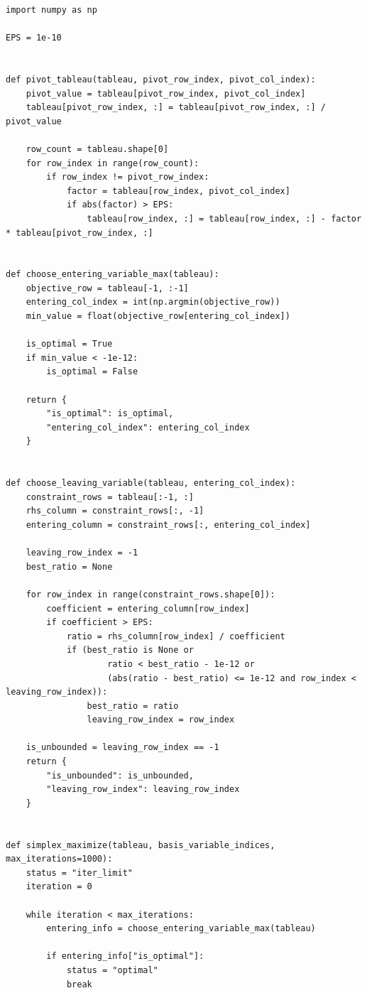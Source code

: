 \documentclass[a4paper,14pt]{extarticle}
\begin{document}
\begin{lstlisting}
import numpy as np

EPS = 1e-10


def pivot_tableau(tableau, pivot_row_index, pivot_col_index):
    pivot_value = tableau[pivot_row_index, pivot_col_index]
    tableau[pivot_row_index, :] = tableau[pivot_row_index, :] / pivot_value

    row_count = tableau.shape[0]
    for row_index in range(row_count):
        if row_index != pivot_row_index:
            factor = tableau[row_index, pivot_col_index]
            if abs(factor) > EPS:
                tableau[row_index, :] = tableau[row_index, :] - factor * tableau[pivot_row_index, :]


def choose_entering_variable_max(tableau):
    objective_row = tableau[-1, :-1]
    entering_col_index = int(np.argmin(objective_row))
    min_value = float(objective_row[entering_col_index])

    is_optimal = True
    if min_value < -1e-12:
        is_optimal = False

    return {
        "is_optimal": is_optimal,
        "entering_col_index": entering_col_index
    }


def choose_leaving_variable(tableau, entering_col_index):
    constraint_rows = tableau[:-1, :]
    rhs_column = constraint_rows[:, -1]
    entering_column = constraint_rows[:, entering_col_index]

    leaving_row_index = -1
    best_ratio = None

    for row_index in range(constraint_rows.shape[0]):
        coefficient = entering_column[row_index]
        if coefficient > EPS:
            ratio = rhs_column[row_index] / coefficient
            if (best_ratio is None or
                    ratio < best_ratio - 1e-12 or
                    (abs(ratio - best_ratio) <= 1e-12 and row_index < leaving_row_index)):
                best_ratio = ratio
                leaving_row_index = row_index

    is_unbounded = leaving_row_index == -1
    return {
        "is_unbounded": is_unbounded,
        "leaving_row_index": leaving_row_index
    }


def simplex_maximize(tableau, basis_variable_indices, max_iterations=1000):
    status = "iter_limit"
    iteration = 0

    while iteration < max_iterations:
        entering_info = choose_entering_variable_max(tableau)

        if entering_info["is_optimal"]:
            status = "optimal"
            break


\end{lstlisting}
\end{document}

